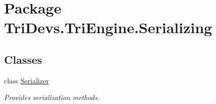 \hypertarget{namespace_tri_devs_1_1_tri_engine_1_1_serializing}{\section{Package Tri\-Devs.\-Tri\-Engine.\-Serializing}
\label{namespace_tri_devs_1_1_tri_engine_1_1_serializing}
}
\subsection*{Classes}
\begin{DoxyCompactItemize}
\item 
class \hyperlink{class_tri_devs_1_1_tri_engine_1_1_serializing_1_1_serializer}{Serializer}
\begin{DoxyCompactList}\small\item\em Provides serialization methods. \end{DoxyCompactList}\end{DoxyCompactItemize}
